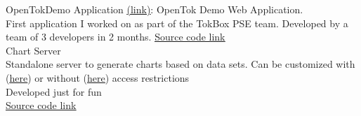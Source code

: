 \documentclass[]{resume}
\begin{document}
\begin{minipage}[t]{0.33\textwidth}
\sectionsep
\textbullet{} OpenTokDemo Application \href{https://opentokdemo.tokbox.com}{{\underline{(link)}}}:
OpenTok Demo Web Application.\\
First application I worked on as part of the TokBox PSE team. Developed by a team of 3 developers in 2 months.
\href{https://github.com/opentok/OpenTokRTC-V2}{{\underline{Source code link}}}\\

\sectionsep
\textbullet{} Chart Server\\
Standalone server to generate charts based on data sets. Can be customized with (\href{https://chartgeneratorprivate.herokuapp.com}{{\underline{here}}})
or without (\href{https://chartgenerator.herokuapp.com}{{\underline{here}}}) access restrictions \\
Developed just for fun\\
\href{https://github.com/mcjimenez/chartServer}{{\underline{Source code link}}}\\
\sectionsep

\end{minipage}
\hfill

\newpage

\lastupdated

\end{document}

